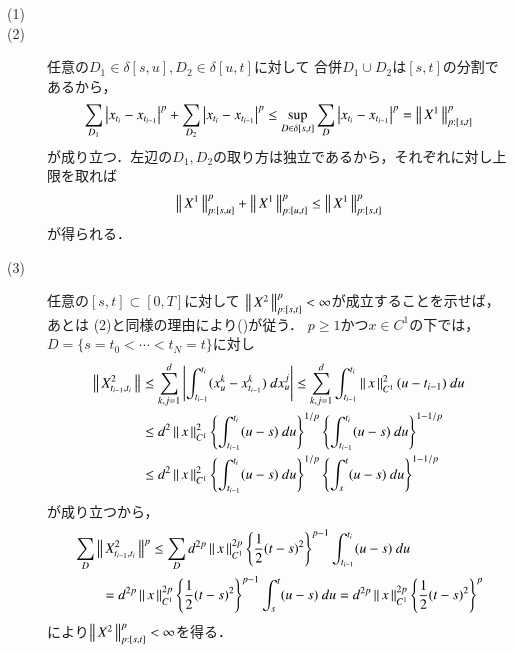 	\begin{thm}\mbox{}
		\begin{description}
			\item[(1)]
			\item[(2)] 任意の$D_1 \in \delta[s,u],D_2 \in \delta[u,t]$に対して
				合併$D_1 \cup D_2$は$[s,t]$の分割であるから，
				\begin{align}
					\sum_{D_1}\left| x_{t_i} - x_{t_{i-1}} \right|^p
					+ \sum_{D_2}\left| x_{t_i} - x_{t_{i-1}} \right|^p
					\leq \operatorname*{sup}_{D \in \delta[s,t]} \sum_{D} \left| x_{t_i} - x_{t_{i-1}} \right|^p
					= \left\|\, X^1\, \right\|_{p:[s,t]}^p
				\end{align}
				が成り立つ．左辺の$D_1,D_2$の取り方は独立であるから，それぞれに対し上限を取れば
				\begin{align}
					\left\|\, X^1\, \right\|_{p:[s,u]}^p + \left\|\, X^1\, \right\|_{p:[u,t]}^p
					\leq \left\|\, X^1\, \right\|_{p:[s,t]}^p
				\end{align}
				が得られる．
				
			\item[(3)] 任意の$[s,t] \subset [0,T]$に対して
				$\left\|\, X^2\, \right\|_{p:[s,t]}^p < \infty$が成立することを示せば，あとは
				(2)と同様の理由により()が従う．
				$p \geq 1$かつ$x \in C^1$の下では，$D = \{s=t_0 < \cdots < t_N = t\}$に対し
				\begin{align}
					\left\|\, X^2_{t_{i-1},t_i}\, \right\|_{}
					&\leq \sum_{k,j=1}^d \left| \int_{t_{i-1}}^{t_i} (x^k_u - x^k_{t_{i-1}})\ dx^j_u \right|
					\leq \sum_{k,j=1}^d \int_{t_{i-1}}^{t_i} \left\|\, x\, \right\|_{C^1}^2(u-t_{i-1})\ du \\
					&\leq d^2 \left\|\, x\, \right\|_{C^1}^2 \left\{ \int_{t_{i-1}}^{t_i} (u-s)\ du \right\}^{1/p}
						\left\{ \int_{t_{i-1}}^{t_i} (u-s)\ du \right\}^{1-1/p} \\
					&\leq d^2 \left\|\, x\, \right\|_{C^1}^2 \left\{ \int_{t_{i-1}}^{t_i} (u-s)\ du \right\}^{1/p}
						\left\{ \int_s^t (u-s)\ du \right\}^{1-1/p}
				\end{align}
				が成り立つから，
				\begin{align}
					&\sum_D \left\|\, X^2_{t_{i-1},t_i}\, \right\|_{}^p
					\leq \sum_D d^{2p}\left\|\, x\, \right\|_{C^1}^{2p} \left\{ \frac{1}{2}(t-s)^2 \right\}^{p-1}
						\int_{t_{i-1}}^{t_i} (u-s)\ du \\
					&\qquad= d^{2p}\left\|\, x\, \right\|_{C^1}^{2p} \left\{ \frac{1}{2}(t-s)^2 \right\}^{p-1}
						\int_s^t (u-s)\ du
					= d^{2p}\left\|\, x\, \right\|_{C^1}^{2p} \left\{ \frac{1}{2}(t-s)^2 \right\}^p
				\end{align}
				により$\left\|\, X^2\, \right\|_{p:[s,t]}^p < \infty$を得る．
				\QED
		\end{description}
	\end{thm}
	
